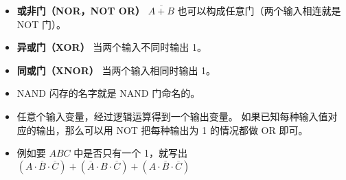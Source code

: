 \begin{itemize}
\item \textbf{或非门（NOR，NOT OR）} $\overline{A+B}$ 也可以构成任意门（两个输入相连就是 NOT 门）。
\item \textbf{异或门（XOR）} 当两个输入不同时输出 1。
\item \textbf{同或门（XNOR）} 当两个输入相同时输出 1。
\item NAND 闪存的名字就是 NAND 门命名的。
\item 任意个输入变量，经过逻辑运算得到一个输出变量。 如果已知每种输入值对应的输出，那么可以用 NOT 把每种输出为 1 的情况都做 OR 即可。
\item 例如要 $ABC$ 中是否只有一个 1，就写出 $(A\cdot\overline B\cdot\overline C) + (\overline A\cdot B\cdot\overline C) + (A\cdot\overline B\cdot\overline C)$
\end{itemize}
